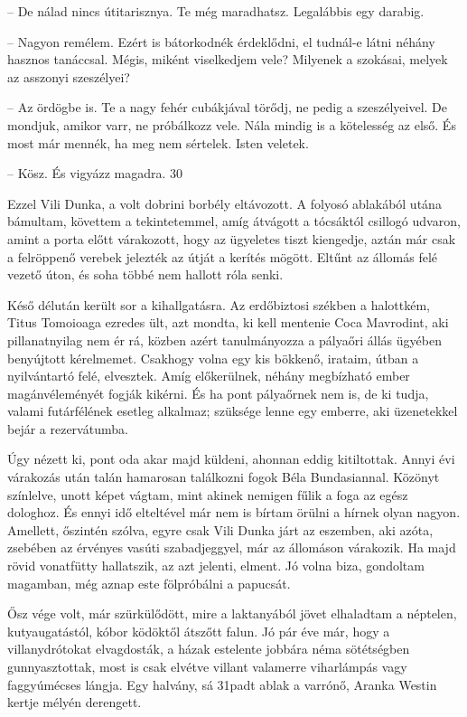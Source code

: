 \documentclass{IEEEtran}
\begin{document}
– De nálad nincs útitarisznya. Te még maradhatsz. Legalábbis egy darabig.

– Nagyon remélem. Ezért is bátorkodnék érdeklődni, el tudnál-e látni néhány
hasznos tanáccsal. Mégis, miként viselkedjem vele? Milyenek a szokásai, melyek
az asszonyi szeszélyei?

– Az ördögbe is. Te a nagy fehér cubákjával törődj, ne pedig a szeszélyeivel.
De mondjuk, amikor varr, ne próbálkozz vele. Nála mindig is a kötelesség az
első. És most már mennék, ha meg nem sértelek. Isten veletek.

– Kösz. És vigyázz magadra.
30

Ezzel Vili Dunka, a volt dobrini borbély eltávozott. A folyosó ablakából utána
bámultam, követtem a tekintetemmel, amíg átvágott a tócsáktól csillogó
udvaron, amint a porta előtt várakozott, hogy az ügyeletes tiszt kiengedje,
aztán már csak a felröppenő verebek jelezték az útját a kerítés mögött. Eltűnt
az állomás felé vezető úton, és soha többé nem hallott róla senki.

Késő délután került sor a kihallgatásra. Az erdőbiztosi székben a halottkém,
Titus Tomoioaga ezredes ült, azt mondta, ki kell mentenie Coca Mavrodint, aki
pillanatnyilag nem ér rá, közben azért tanulmányozza a pályaőri állás ügyében
benyújtott kérelmemet. Csakhogy volna egy kis bökkenő, irataim, útban a
nyilvántartó felé, elvesztek. Amíg előkerülnek, néhány megbízható ember
magánvéleményét fogják kikérni. És ha pont pályaőrnek nem is, de ki tudja,
valami futárfélének esetleg alkalmaz; szüksége lenne egy emberre, aki
üzenetekkel bejár a rezervátumba.

Úgy nézett ki, pont oda akar majd küldeni, ahonnan eddig kitiltottak. Annyi
évi várakozás után talán hamarosan találkozni fogok Béla Bundasiannal. Közönyt
színlelve, unott képet vágtam, mint akinek nemigen fűlik a foga az egész
dologhoz. És ennyi idő elteltével már nem is bírtam örülni a hírnek olyan
nagyon. Amellett, őszintén szólva, egyre csak Vili Dunka járt az eszemben, aki
azóta, zsebében az érvényes vasúti szabadjeggyel, már az állomáson várakozik.
Ha majd rövid vonatfütty hallatszik, az azt jelenti, elment. Jó volna biza,
gondoltam magamban, még aznap este fölpróbálni a papucsát.

Ősz vége volt, már szürkülődött, mire a laktanyából jövet elhaladtam a
néptelen, kutyaugatástól, kóbor ködöktől átszőtt falun. Jó pár éve már, hogy a
villanydrótokat elvagdosták, a házak estelente jobbára néma sötétségben
gunnyasztottak, most is csak elvétve villant valamerre viharlámpás vagy
faggyúmécses lángja. Egy halvány, sá 31padt ablak a varrónő, Aranka Westin
kertje mélyén derengett.
\end{document}
